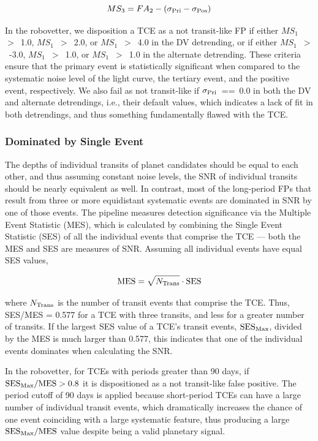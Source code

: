\begin{equation}
    MS_{3} = FA_{2} - (\sigma_{\rm Pri} - \sigma_{\rm Pos})
\end{equation}


In the robovetter, we disposition a TCE as a not transit-like FP if either $MS_{1}$~$>$~1.0, $MS_{1}$~$>$~2.0, or $MS_{1}$~$>$~4.0 in the DV detrending, or if either $MS_{1}$~$>$~-3.0, $MS_{1}$~$>$~1.0, or $MS_{1}$~$>$~1.0 in the alternate detrending. These criteria ensure that the primary event is statistically significant when compared to the systematic noise level of the light curve, the tertiary event, and the positive event, respectively. We also fail as not transit-like if $\sigma_{\rm Pri}$~==~0.0 in both the DV and alternate detrendings, i.e., their default values, which indicates a lack of fit in both detrendings, and thus something fundamentally flawed with the TCE.


\subsubsection{Dominated by Single Event}

The depths of individual transits of planet candidates should be equal to each other, and thus assuming constant noise levels, the SNR of individual transits should be nearly equivalent as well. In contrast, most of the long-period FPs that result from three or more equidistant systematic events are dominated in SNR by one of those events. The \kepler{} pipeline measures detection significance via the Multiple Event Statistic (MES), which is calculated by combining the Single Event Statistic (SES) of all the individual events that comprise the TCE --- both the MES and SES are measures of SNR. Assuming all individual events have equal SES values,

\begin{equation}
{\rm MES} = \sqrt{N_{\rm Trans}} \cdot {\rm SES}
\end{equation}

\noindent where $N_{\rm Trans}$ is the number of transit events that comprise the TCE. Thus, SES/MES = 0.577 for a TCE with three transits, and less for a greater number of transits. If the largest SES value of a TCE's transit events, ${\rm SES}_{\rm Max}$, divided by the MES is much larger than 0.577, this indicates that one of the individual events dominates when calculating the SNR.

In the robovetter, for TCEs with periods greater than 90 days, if ${{\rm SES}_{\rm Max} / {\rm MES} > 0.8}$ it is dispositioned as a not transit-like false positive. The period cutoff of 90 days is applied because short-period TCEs can have a large number of individual transit events, which dramatically increases the chance of one event coinciding with a large systematic feature, thus producing a large ${{\rm SES}_{\rm Max} / {\rm MES}}$ value despite being a valid planetary signal.


